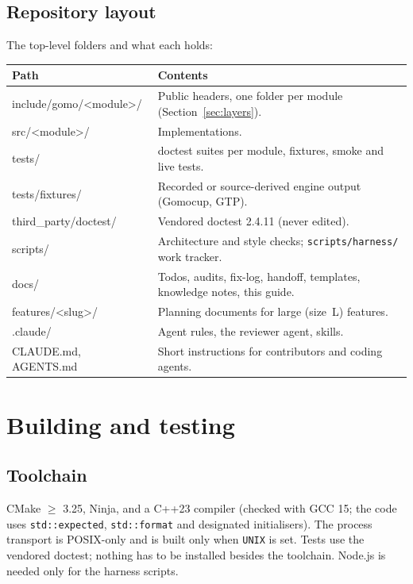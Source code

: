 \documentclass[11pt,a4paper]{article}
\newcommand{\code}[1]{\texttt{#1}}
\newcommand{\file}[1]{\texttt{#1}}
\begin{document}
\subsection{Repository layout}

The top-level folders and what each holds:

\begin{center}
\small
\begin{tabularx}{\textwidth}{@{}>{\ttfamily}l X@{}}
\toprule
\normalfont\textbf{Path} & \textbf{Contents} \\
\midrule
include/gomo/<module>/ & Public headers, one folder per module (Section~\ref{sec:layers}). \\
src/<module>/            & Implementations. \\
tests/                   & doctest suites per module, fixtures, smoke and live tests. \\
tests/fixtures/          & Recorded or source-derived engine output (Gomocup, GTP). \\
third\_party/doctest/    & Vendored doctest 2.4.11 (never edited). \\
scripts/                 & Architecture and style checks; \file{scripts/harness/} work tracker. \\
docs/                    & Todos, audits, fix-log, handoff, templates, knowledge notes, this guide. \\
features/<slug>/         & Planning documents for large (size~L) features. \\
.claude/                 & Agent rules, the reviewer agent, skills. \\
CLAUDE.md, AGENTS.md     & Short instructions for contributors and coding agents. \\
\bottomrule
\end{tabularx}
\end{center}

\section{Building and testing}

\subsection{Toolchain}

CMake $\geq$ 3.25, Ninja, and a C++23 compiler (checked with GCC 15; the code uses
\code{std::expected}, \code{std::format} and designated initialisers). The process transport is
POSIX-only and is built only when \code{UNIX} is set. Tests use the vendored doctest; nothing has to
be installed besides the toolchain. Node.js is needed only for the harness scripts.
\end{document}
